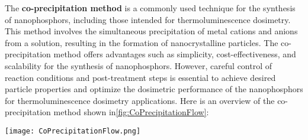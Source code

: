 \documentclass[../synthesis.tex]{subfiles}
\begin{document}
    The \textbf{co-precipitation method}\cite{a8} is a commonly used technique for the synthesis of nanophosphors, including 
    those intended for thermoluminescence dosimetry. This method involves the simultaneous precipitation of 
    metal cations and anions from a solution, resulting in the formation of nanocrystalline particles.
    The co-precipitation method offers advantages such as simplicity, cost-effectiveness, and scalability for 
    the synthesis of nanophosphors. However, careful control of reaction conditions and post-treatment steps 
    is essential to achieve desired particle properties and optimize the dosimetric performance of the 
    nanophosphors for thermoluminescence dosimetry applications. Here is an overview of the co-precipitation 
    method shown in\ref{fig:CoPrecipitationFlow}:
    \begin{Figure}
        \centering
        \texttt{[image: CoPrecipitationFlow.png]}
        \label{fig:CoPrecipitationFlow}
    \end{Figure}
\end{document}
